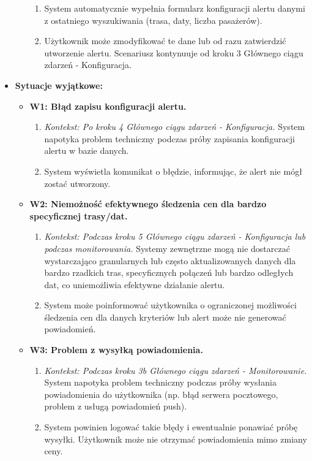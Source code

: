 \documentclass[a4paper,12pt]{article}
\begin{document}
\begin{itemize}
\begin{itemize}
\begin{enumerate}
                    \item System automatycznie wypełnia formularz konfiguracji alertu danymi z ostatniego wyszukiwania (trasa, daty, liczba pasażerów).
                    \item Użytkownik może zmodyfikować te dane lub od razu zatwierdzić utworzenie alertu. Scenariusz kontynuuje od kroku 3 Głównego ciągu zdarzeń - Konfiguracja.
                \end{enumerate}
        \end{itemize}
    \item \textbf{Sytuacje wyjątkowe:}
        \begin{itemize}
            \item \textbf{W1: Błąd zapisu konfiguracji alertu.}
                \begin{enumerate}
                    \item \textit{Kontekst: Po kroku 4 Głównego ciągu zdarzeń - Konfiguracja.} System napotyka problem techniczny podczas próby zapisania konfiguracji alertu w bazie danych.
                    \item System wyświetla komunikat o błędzie, informując, że alert nie mógł zostać utworzony.
                \end{enumerate}
            \item \textbf{W2: Niemożność efektywnego śledzenia cen dla bardzo specyficznej trasy/dat.}
                \begin{enumerate}
                    \item \textit{Kontekst: Podczas kroku 5 Głównego ciągu zdarzeń - Konfiguracja lub podczas monitorowania.} Systemy zewnętrzne mogą nie dostarczać wystarczająco granularnych lub często aktualizowanych danych dla bardzo rzadkich tras, specyficznych połączeń lub bardzo odległych dat, co uniemożliwia efektywne działanie alertu.
                    \item System może poinformować użytkownika o ograniczonej możliwości śledzenia cen dla danych kryteriów lub alert może nie generować powiadomień.
                \end{enumerate}
            \item \textbf{W3: Problem z wysyłką powiadomienia.}
                \begin{enumerate}
                    \item \textit{Kontekst: Podczas kroku 3b Głównego ciągu zdarzeń - Monitorowanie.} System napotyka problem techniczny podczas próby wysłania powiadomienia do użytkownika (np. błąd serwera pocztowego, problem z usługą powiadomień push).
                    \item System powinien logować takie błędy i ewentualnie ponawiać próbę wysyłki. Użytkownik może nie otrzymać powiadomienia mimo zmiany ceny.
                \end{enumerate}
        \end{itemize}
\end{itemize}
\end{document}
